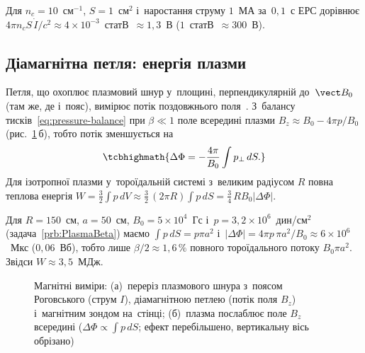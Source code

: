 \begin{Estimate}
Для $n_c=10$~см$^{-1}$, $S=1$~см$^2$ і~наростання струму $1$~МА за~$0{,}1$~с
ЕРС дорівнює $4\pi n_cS\,\dot I/c^2\approx4\times10^{-3}$~статВ~$\approx1{,}3$~В
($1$~статВ~$\approx300$~В).
\end{Estimate}

\subsection*{Діамагнітна петля: енергія плазми}
Петля, що охоплює плазмовий шнур у~площині, перпендикулярній до~$\vect B_0$ (там же, де і~пояс),
вимірює потік поздовжнього поля~\cite{chen2016introduction}. З~балансу тисків~\eqref{eq:pressure-balance} при $\beta\ll1$
поле всередині плазми $B_z\approx B_0-4\pi p/B_0$ (рис.~\ref{pic:magnetic-diagnostics}\,б), тобто
потік зменшується на
\begin{equation}\label{eq:diamagnetic-loop}
	\tcbhighmath{\Delta\Phi=-\frac{4\pi}{B_0}\int p_\perp\,dS.}
\end{equation}
Для ізотропної плазми у~тороїдальній системі з~великим радіусом $R$ повна теплова енергія
$W=\tfrac32\int p\,dV\approx\tfrac32\,(2\pi R)\int p\,dS=\tfrac34\,RB_0|\Delta\Phi|$.

\begin{Estimate}
Для $R=150$~см, $a=50$~см, $B_0=5\times10^4$~Гс і~$p=3{,}2\times10^6$~дин/см$^2$
(задача~\ref{prb:PlasmaBeta}) маємо $\int p\,dS=p\pi a^2$ і~$|\Delta\Phi|=4\pi p\,\pi a^2/B_0
\approx6\times10^{6}$~Мкс ($0{,}06$~Вб), тобто лише $\beta/2\approx1{,}6\,\%$ повного
тороїдального потоку $B_0\pi a^2$. Звідси $W\approx3{,}5$~МДж.
\end{Estimate}

\begin{figure}[ht]\centering
	\begin{subfigure}[t]{0.5\linewidth}\centering
		\caption{}
	\end{subfigure}%
	\begin{subfigure}[t]{0.5\linewidth}\centering
		\caption{}
	\end{subfigure}
	\caption{Магнітні виміри: (а)~переріз плазмового шнура з~поясом Роговського (струм $I$), діамагнітною
	петлею (потік поля $B_z$) і~магнітним зондом на~стінці; (б)~плазма послаблює поле $B_z$ всередині
	($\Delta\Phi\propto\int p\,dS$; ефект перебільшено, вертикальну вісь обрізано)}
	\label{pic:magnetic-diagnostics}
\end{figure}

